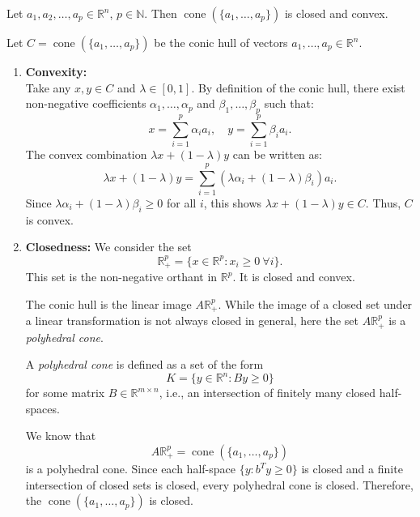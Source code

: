 \documentclass{ExerciseSheet}
\newif\ifsolutions
\begin{document}



\begin{problem}
Let $a_1, a_2, \ldots, a_p \in \mathbb{R}^n $, $ p \in \mathbb{N} $. Then $\operatorname{cone}(\{a_1, \ldots, a_p\})$ is closed and convex.
\end{problem}

\ifsolutions
\vskip 0.3cm


\begin{solution}
    Let $ C = \operatorname{cone}(\{a_1, \ldots, a_p\}) $ be the conic hull of vectors $ a_1, \ldots, a_p \in \mathbb{R}^n $.

\begin{enumerate}
    \item \textbf{Convexity:} \\
    Take any $ x, y \in C $ and $ \lambda \in [0,1] $. By definition of the conic hull, there exist non-negative coefficients $ \alpha_1, \ldots, \alpha_p $ and $ \beta_1, \ldots, \beta_p $ such that:
    \[
    x = \sum_{i=1}^p \alpha_i a_i, \quad y = \sum_{i=1}^p \beta_i a_i.
    \]
    The convex combination $ \lambda x + (1-\lambda)y $ can be written as:
    \[
    \lambda x + (1-\lambda)y = \sum_{i=1}^p (\lambda \alpha_i + (1-\lambda)\beta_i) a_i.
    \]
    Since $ \lambda \alpha_i + (1-\lambda)\beta_i \geq 0 $ for all $ i $, this shows $ \lambda x + (1-\lambda)y \in C $. Thus, $ C $ is convex.

    \item \textbf{Closedness:} We consider the set
\[
\mathbb{R}^p_{+} = \{ x \in \mathbb{R}^p : x_i \ge 0 \ \forall i \}.
\]
This set is the non-negative orthant in $\mathbb{R}^p$. It is closed and convex.

The conic hull is the linear image $A \mathbb{R}^p_{+}$.  
While the image of a closed set under a linear transformation is not always closed in general, here the set $A \mathbb{R}^p_{+}$ is a \emph{polyhedral cone}.

A \emph{polyhedral cone} is defined as a set of the form
\[
K = \{ y \in \mathbb{R}^n : B y \ge 0 \}
\]
for some matrix $B \in \mathbb{R}^{m \times n}$, i.e., an intersection of finitely many closed half-spaces.

We know that
\[
A \mathbb{R}^p_{+} = \operatorname{cone}(\{a_{1}, \dots, a_{p}\})
\]
is a polyhedral cone. Since each half-space $\{ y : b^T y \ge 0 \}$ is closed and a finite intersection of closed sets is closed, every polyhedral cone is closed. Therefore, the $\operatorname{cone}(\{a_{1}, \dots, a_{p}\})$ is closed.
    
    
\end{enumerate}

\end{solution}
\end{document}
